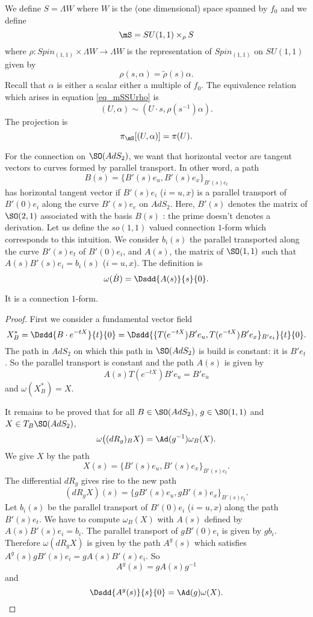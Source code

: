 We define $S=\Lambda W$ where $W$ is the (one dimensional) space spanned by $f_0$ and we define 
\begin{equation} \label{eq_mSSUrho}
  \mS= SU(1,1)\times_{\rho}S
\end{equation}
where $\rho\colon Spin_{(1,1)}\times\Lambda W\to \Lambda W$ is the representation of $Spin_{(1,1)}$ on $SU(1,1)$ given by
\begin{equation}
  \rho(s,\alpha)=\tilde\rho(s)\alpha.
\end{equation}
Recall that $\alpha$ is either a scalar either a multiple of $f_0$. The equivalence relation which arises in equation \eqref{eq_mSSUrho} is
\begin{equation}
  (U,\alpha)\sim(U\cdot s,\rho(s^{-1})\alpha).
\end{equation}
The projection is
\[ 
  \pi_{\mS}[(U,\alpha)]=\pi(U).
\]

For the connection on $\SO(AdS_2)$, we want that horizontal vector are tangent vectors to curves formed by parallel transport. In other word, a path 
\[
B(s)=\{ B'(s)e_u,B'(s)e_x \}_{B'(s)e_t}
\]
 has horizontal tangent vector if $B'(s)e_i$ ($i=u,x$) is a parallel transport of $B'(0)e_i$ along the curve $B'(s)e_e$ on $AdS_2$. Here, $B'(s)$ denotes the matrix of $\SO(2,1)$ associated with the basis $B(s)$ : the prime doesn't denotes a derivation. Let us define the $so(1,1)$ valued connection $1$-form which corresponds to this intuition. We consider $b_i(s)$ the parallel transported along the curve $B'(s)e_t$ of $B'(0)e_i$, and $A(s)$, the matrix of $\SO(1,1)$ such that $A(s)B'(s)e_i=b_i(s)$ ($i=u,x$). The definition is
\[ 
  \omega(\dot B)=\Dsdd{ A(s) }{s}{0}.
\]


\begin{proposition}
It is a connection $1$-form.
\end{proposition}

\begin{proof}
First we consider a fundamental vector field
\[ 
  X^*_B=\Dsdd{ B\cdot e^{-tX} }{t}{0}=\Dsdd{ \{ T( e^{-tX})B'e_u,T( e^{-tX})B'e_x \}_{B'e_t} }{t}{0}.
\]
The path in $AdS_2$ on which this path in $\SO(AdS_2)$ is build is constant: it is $B'e_t$. So the parallel transport is constant and the path $A(s)$ is given by
\[ 
  A(s)T( e^{-tX})B'e_u=B'e_u
\]
and $\omega(X^*_B)=X$.

It remains to be proved that for all $B\in \SO(AdS_2)$, $g\in \SO(1,1)$ and $X\in T_B\SO(AdS_2)$,
\begin{equation}
\omega\big( (dR_g)_BX \big)=\Ad(g^{-1})\omega_B(X).
\end{equation}
We give $X$ by the path 
\[ 
  X(s)=\{ B'(s)e_u,B'(s)e_x \}_{B'(s)e_t}.
\]
 The differential $dR_g$ gives rise to the new path
\[ 
  (dR_gX)(s)=\{ gB'(s)e_u,gB'(s)e_x \}_{B'(s)e_t}.
\]
Let $b_i(s)$ be the parallel transport of $B'(0)e_i$ ($i=u,x$) along the path $B'(s)e_t$. We have to compute $\omega_B(X)$ with $A(s)$ defined by $A(s)B'(s)e_i=b_i$. The parallel transport of $gB'(0)e_i$ is given by $gb_i$. Therefore $\omega(dR_gX)$ is given by the path $A^g(s)$ which satisfies $A^g(s)gB'(s)e_i=gA(s)B'(s)e_i$. So
\[ 
  A^g(s)=gA(s)g^{-1}
\]
and
\[ 
  \Dsdd{ A^g(s) }{s}{0}=\Ad(g)\omega(X).
\]

\end{proof}


